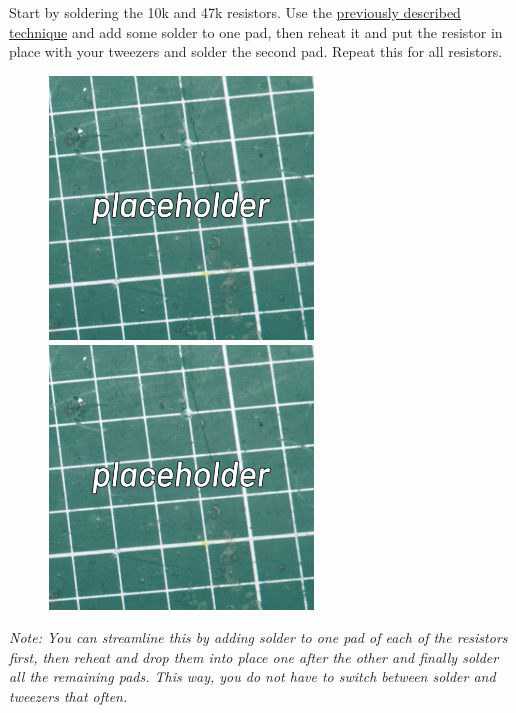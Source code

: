 \documentclass[12pt, a4paper]{article}
\begin{document}
Start by soldering the 10k and 47k resistors. Use the
\hyperref[sec:basic_smd_soldering_techniques]{previously described technique} and add some
solder to one pad, then reheat it and put the resistor in place with your tweezers and solder
the second pad. Repeat this for all resistors.

\begin{figure}[H]
    \centering
    \includegraphics[width=7cm]{images/placeholder.jpg}
    \hspace{2mm}
    \includegraphics[width=7cm]{images/placeholder.jpg}
\end{figure}

\textit{Note: You can streamline this by adding solder to one pad of each of the resistors
first, then reheat and drop them into place one after the other and finally solder all the
remaining pads. This way, you do not have to switch between solder and tweezers that often.}
\end{document}

